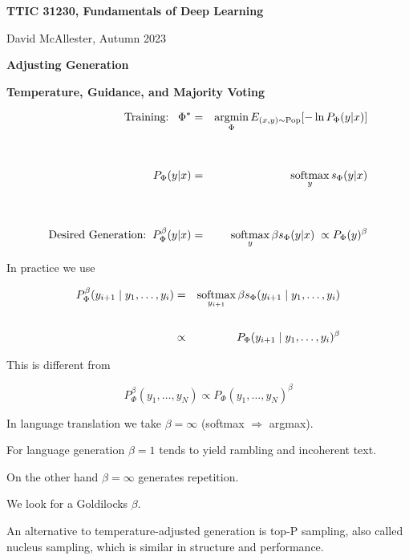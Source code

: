 

\usepackage{cancel}



{\Huge

  \centerline{\bf TTIC 31230, Fundamentals of Deep Learning}
  \bigskip
  \centerline{David McAllester, Autumn 2023}
  \vfill
  \vfil
  \centerline{\bf Adjusting Generation}
  \vfill
  \centerline{\bf Temperature, Guidance, and Majority Voting}
  \vfill
  \vfill

\begin{eqnarray*}
\mbox{Training:}\;\;\;\Phi^* & = & \operatorname*{argmin}_\Phi E_{(x,y) \sim \mathrm{Pop}}[-\ln P_\Phi(y|x)] \\
\\
\\
P_\Phi(y|x) & = & \operatorname*{softmax}_y s_\Phi(y|x) \\
\\
\\
\mbox{Desired Generation:}\;\;P^\beta_\Phi(y|x) & = & \operatorname*{softmax}_y \beta s_\Phi(y|x)\;\propto P_\Phi(y)^\beta
\end{eqnarray*}


In practice we use

\begin{eqnarray*}
P^\beta_\Phi(y_{i+1}\;|\;y_1,\ldots,y_i) & = & \operatorname*{softmax}_{y_{i+1}} \beta s_\Phi(y_{i+1}\;|\;y_1,\dots,y_i) \\
\\
& \propto &  P_\Phi(y_{i+1}\;|\;y_1,\ldots,y_i)^\beta
\end{eqnarray*}

\vfill
This is different from

\vfill
$$P^\beta_\Phi(y_1,\ldots,y_N) \propto P_\Phi(y_1,\ldots,y_N)^\beta$$


In language translation we take $\beta = \infty$ (softmax $\Rightarrow$ argmax).

\vfill
For language generation $\beta = 1$ tends to yield rambling and incoherent text.

\vfill
On the other hand $\beta = \infty$ generates repetition.

\vfill
We look for a Goldilocks $\beta$.

\vfill
An alternative to temperature-adjusted generation is top-P sampling, also called nucleus sampling, which is similar in structure and performance.

}
